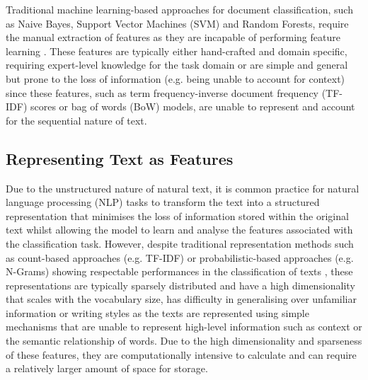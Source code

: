 \documentclass[a4paper,twoside,phd]{BYUPhys}
\begin{document}
Traditional machine learning-based approaches for document classification, such as Naive Bayes, Support Vector Machines (SVM) and Random Forests, require the manual extraction of features \cite{Aggarwal2012} \cite{Allahyari2017} \cite{Korde2012} \cite{Pasupa2016} as they are incapable of performing feature learning \cite{Basheer2000}. These features are typically either hand-crafted and domain specific, requiring expert-level knowledge for the task domain \cite{Pasupa2016} or are simple and general but prone to the loss of information (e.g. being unable to account for context) since these features, such as term frequency-inverse document frequency (TF-IDF) scores or bag of words (BoW) models, are unable to represent and account for the sequential nature of text.

\subsection{Representing Text as Features}
\label{sec:TextRepresentations}

Due to the unstructured nature of natural text, it is common practice for natural language processing (NLP) tasks to transform the text into a structured representation that minimises the loss of information stored within the original text whilst allowing the model to learn and analyse the features associated with the classification task. However, despite traditional representation methods such as count-based approaches (e.g. TF-IDF) or probabilistic-based approaches (e.g. N-Grams) showing respectable performances in the classification of texts \cite{Zhang} \cite{Zhou2015}, these representations are typically sparsely distributed and have a high dimensionality that scales with the vocabulary size, has difficulty in generalising over unfamiliar information or writing styles \cite{Rosenfeld2000} as the texts are represented using simple mechanisms that are unable to represent high-level information such as context or the semantic relationship of words. Due to the high dimensionality and sparseness of these features, they are computationally intensive to calculate and can require a relatively larger amount of space for storage.\newline
\end{document}
